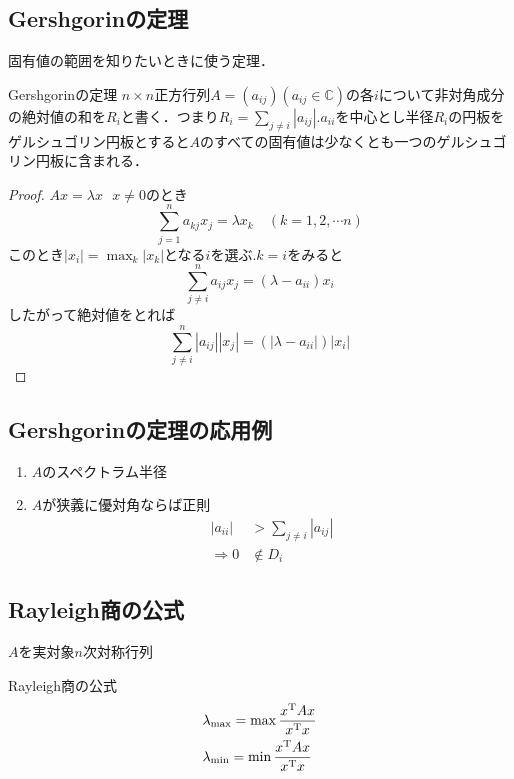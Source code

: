 \subsection{Gershgorinの定理}
固有値の範囲を知りたいときに使う定理．
\begin{itembox}[l]{Gershgorinの定理}
  $n\times n$正方行列$A=(a_{ij})(a_{ij}\in\mathbb{C})$の各$i$について非対角成分の絶対値の和を$R_i$と書く．つまり$R_i =\sum_{j\neq i}|a_{ij}|$.$a_{ii}$を中心とし半径$R_i$の円板をゲルシュゴリン円板とすると$A$のすべての固有値は少なくとも一つのゲルシュゴリン円板に含まれる．
\end{itembox}
\begin{proof}
  $Ax=\lambda x\ \ \ x\neq 0$のとき
  \begin{equation}
      \sum_{j=1}^n a_{kj}x_j =\lambda x_k\quad  (k=1,2,\cdots n)
  \end{equation}
  このとき$|x_i |=\max_{k} |x_k|$となる$i$を選ぶ.$k=i$をみると
  \begin{equation}
  \sum_{j\neq i}^n a_{ij}x_j =(\lambda -a_{ii}) x_i     
  \end{equation}
  したがって絶対値をとれば
  \begin{equation}
  \sum_{j\neq i}^n |a_{ij}| |x_j | =(|\lambda -a_{ii}|) |x_i|    
  \end{equation}
 \end{proof}
\subsection{Gershgorinの定理の応用例}
\begin{enumerate}
    \item $A$のスペクトラム半径
    \item $A$が狭義に優対角ならば正則
    \begin{align}
        |a_{ii}| &> \sum_{j \neq i} |a_{ij}|\\
        \Rightarrow 0 &\not \in D_i
    \end{align}
\end{enumerate}
\subsection{Rayleigh商の公式}
$A$を実対象$n$次対称行列
\begin{itembox}[l]{Rayleigh商の公式}
  \begin{align}
    &{\lambda}_{\max}=\max \displaystyle\frac{{x}^{\mathrm{T}}Ax}{{x}^{\mathrm{T}}x}\\
    &{\lambda}_{\min}=\min \displaystyle\frac{{x}^{\mathrm{T}}Ax}{{x}^{\mathrm{T}}x}
  \end{align}
\end{itembox}
